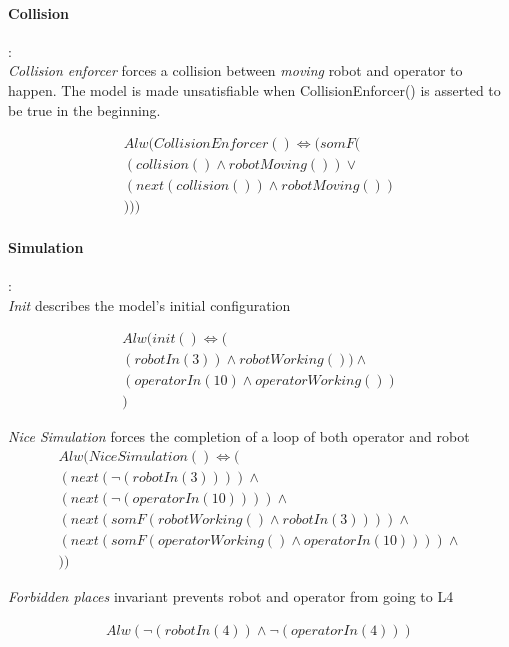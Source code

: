 \paragraph{Collision}:\\

\textit{Collision enforcer} forces a collision between \textit{moving} robot and operator to happen. The model is made unsatisfiable when CollisionEnforcer() is asserted to be true in the beginning.

\begin{align*}
	Alw(CollisionEnforcer()\iff (somF(\\
	(collision() \land robotMoving())\lor\\
	(next(collision()) \land robotMoving())\\
	)))
\end{align*}


\paragraph{Simulation}:\\

\textit{Init} describes the model's initial configuration

\begin{align*}
	Alw(init()\iff (\\
	(robotIn(3))\land robotWorking())\land \\
	(operatorIn(10)\land operatorWorking()) \\
	)
\end{align*}


\textit{Nice Simulation} forces the completion of a loop of both operator and robot
\begin{align*}
	Alw(NiceSimulation()\iff (\\
	(next(\neg(robotIn(3)))) \land \\
	(next(\neg(operatorIn(10)))) \land \\
	(next(somF(robotWorking()\land robotIn(3)))) \land \\
	(next(somF(operatorWorking()\land operatorIn(10)))) \land \\
	))
\end{align*}

\textit{Forbidden places} invariant prevents robot and operator from going to L4

\begin{align*}
	Alw(\neg(robotIn(4)) \land \neg(operatorIn(4)))
\end{align*}

